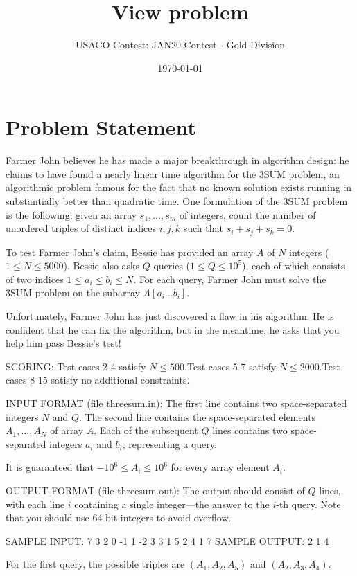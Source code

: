 \documentclass[12pt]{article}
\title{View problem}
\author{USACO Contest: JAN20 Contest - Gold Division}
\date{\today}
\begin{document}
\maketitle

\section*{Problem Statement}

Farmer John believes he has made a major breakthrough in algorithm design: he
claims to have found a nearly linear time algorithm for the 3SUM problem, an
algorithmic problem famous for the fact that no known solution exists running
in substantially better than quadratic time. One
formulation of the 3SUM problem is the following: given an array $s_1,\dots,s_m$
of integers, count the number of unordered triples of distinct indices $i,j,k$
such that
$s_i + s_j + s_k = 0$.

To test Farmer John's claim, Bessie has provided an array $A$ of $N$ integers
($1 \leq N \leq 5000$). Bessie also asks $Q$ queries ($1 \leq Q \leq 10^5$),
each of which consists of two indices $1 \leq a_i \leq b_i \leq N$. For each
query, Farmer John must solve the 3SUM problem on the subarray
$A[a_i \dots b_i]$.

Unfortunately, Farmer John has just discovered a flaw in his algorithm. He is
confident that he can fix the algorithm, but in the meantime, he asks that you
help him pass Bessie's test!

SCORING:
Test cases 2-4 satisfy $N\le 500.$Test cases 5-7 satisfy
$N\le 2000.$Test cases 8-15 satisfy no additional constraints.

INPUT FORMAT (file threesum.in):
The first line contains two space-separated integers $N$ and $Q$. The second
line contains the space-separated elements $A_1,\dots,A_N$ of array $A$. Each of
the subsequent $Q$ lines contains two space-separated integers $a_i$ and $b_i$,
representing a query.

It is guaranteed that $-10^6 \leq A_i \leq 10^6$ for every array element $A_i$.

OUTPUT FORMAT (file threesum.out):
The output should consist of $Q$ lines, with each line $i$ containing a single
integer---the answer to the $i$-th query. Note that you should use 64-bit
integers to avoid overflow. 

SAMPLE INPUT:
7 3
2 0 -1 1 -2 3 3
1 5
2 4
1 7
SAMPLE OUTPUT: 
2
1
4

For the first query, the possible triples are $(A_1,A_2,A_5)$ and
$(A_2,A_3,A_4).$
\end{document}
